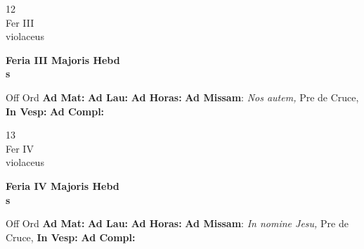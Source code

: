 \documentclass[10pt, openany]{book}
\begin{document}
        \begin{center}
            \begin{minipage}{3.5in}
                \vspace{2em}
                \begin{minipage}{0.5in}
                    {\Huge 12} \\
                    {\normalsize Fer III} \\
                    {\normalsize violaceus}
                \end{minipage}
                \begin{minipage}{3.0in}
                    \textbf{ \large Feria III Majoris Hebd \\
                    \textnormal{\normalsize s}} \\ 
                \end{minipage}
                \begin{justify}Off Ord
                    \textbf{Ad Mat: }
                    \textbf{Ad Lau: }
                    \textbf{Ad Horas: }\textbf{Ad Missam}: \textit{Nos autem,} Pre de Cruce,  
                    \textbf{In Vesp: }
                    \textbf{Ad Compl: }
                \end{justify}
            \end{minipage}
        \end{center}
    
        \begin{center}
            \begin{minipage}{3.5in}
                \vspace{2em}
                \begin{minipage}{0.5in}
                    {\Huge 13} \\
                    {\normalsize Fer IV} \\
                    {\normalsize violaceus}
                \end{minipage}
                \begin{minipage}{3.0in}
                    \textbf{ \large Feria IV Majoris Hebd \\
                    \textnormal{\normalsize s}} \\ 
                \end{minipage}
                \begin{justify}Off Ord
                    \textbf{Ad Mat: }
                    \textbf{Ad Lau: }
                    \textbf{Ad Horas: }\textbf{Ad Missam}: \textit{In nomine Jesu,} Pre de Cruce,  
                    \textbf{In Vesp: }
                    \textbf{Ad Compl: }
                \end{justify}
            \end{minipage}
        \end{center}
    
\end{document}
